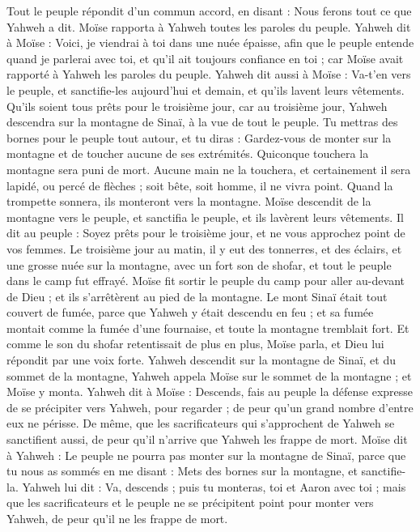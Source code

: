 \begin{multicols}{2}
Tout le peuple répondit d'un commun accord, en disant : Nous ferons tout ce que Yahweh a dit. Moïse rapporta à Yahweh toutes les paroles du peuple.
Yahweh dit à Moïse : Voici, je viendrai à toi dans une nuée épaisse, afin que le peuple entende quand je parlerai avec toi, et qu'il ait toujours confiance en toi ; car Moïse avait rapporté à Yahweh les paroles du peuple.
Yahweh dit aussi à Moïse : Va-t'en vers le peuple, et sanctifie-les aujourd'hui et demain, et qu'ils lavent leurs vêtements.
Qu'ils soient tous prêts pour le troisième jour, car au troisième jour, Yahweh descendra sur la montagne de Sinaï, à la vue de tout le peuple.
Tu mettras des bornes pour le peuple tout autour, et tu diras : Gardez-vous de monter sur la montagne et de toucher aucune de ses extrémités. Quiconque touchera la montagne sera puni de mort.
Aucune main ne la touchera, et certainement il sera lapidé, ou percé de flèches ; soit bête, soit homme, il ne vivra point. Quand la trompette sonnera, ils monteront vers la montagne.
Moïse descendit de la montagne vers le peuple, et sanctifia le peuple, et ils lavèrent leurs vêtements.
Il dit au peuple : Soyez prêts pour le troisième jour, et ne vous approchez point de vos femmes.
Le troisième jour au matin, il y eut des tonnerres, et des éclairs, et une grosse nuée sur la montagne, avec un fort son de shofar, et tout le peuple dans le camp fut effrayé.
Moïse fit sortir le peuple du camp pour aller au-devant de Dieu ; et ils s'arrêtèrent au pied de la montagne.
Le mont Sinaï était tout couvert de fumée, parce que Yahweh y était descendu en feu ; et sa fumée montait comme la fumée d'une fournaise, et toute la montagne tremblait fort.
Et comme le son du shofar retentissait de plus en plus, Moïse parla, et Dieu lui répondit par une voix forte.
Yahweh descendit sur la montagne de Sinaï, et du sommet de la montagne, Yahweh appela Moïse sur le sommet de la montagne ; et Moïse y monta.
Yahweh dit à Moïse : Descends, fais au peuple la défense expresse de se précipiter vers Yahweh, pour regarder ; de peur qu'un grand nombre d'entre eux ne périsse.
De même, que les sacrificateurs qui s'approchent de Yahweh se sanctifient aussi, de peur qu'il n'arrive que Yahweh les frappe de mort.
Moïse dit à Yahweh : Le peuple ne pourra pas monter sur la montagne de Sinaï, parce que tu nous as sommés en me disant : Mets des bornes sur la montagne, et sanctifie-la.
Yahweh lui dit : Va, descends ; puis tu monteras, toi et Aaron avec toi ; mais que les sacrificateurs et le peuple ne se précipitent point pour monter vers Yahweh, de peur qu’il ne les frappe de mort.

\end{multicols}
